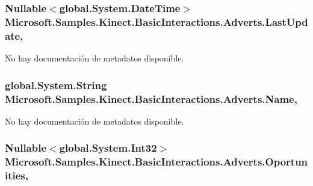 \hypertarget{class_microsoft_1_1_samples_1_1_kinect_1_1_basic_interactions_1_1_adverts_a15fd8b003d880267cc1c3b6eee837e9e}{
\subsubsection[{Last\-Update}]{\setlength{\rightskip}{0pt plus 5cm}Nullable$<$global.\-System.\-Date\-Time$>$ Microsoft.\-Samples.\-Kinect.\-Basic\-Interactions.\-Adverts.\-Last\-Update\hspace{0.3cm}{\ttfamily [get]}, {\ttfamily [set]}}}\label{class_microsoft_1_1_samples_1_1_kinect_1_1_basic_interactions_1_1_adverts_a15fd8b003d880267cc1c3b6eee837e9e}


No hay documentación de metadatos disponible. 

\hypertarget{class_microsoft_1_1_samples_1_1_kinect_1_1_basic_interactions_1_1_adverts_ade56db6e7a214151a3724dc147dda366}{
\subsubsection[{Name}]{\setlength{\rightskip}{0pt plus 5cm}global.\-System.\-String Microsoft.\-Samples.\-Kinect.\-Basic\-Interactions.\-Adverts.\-Name\hspace{0.3cm}{\ttfamily [get]}, {\ttfamily [set]}}}\label{class_microsoft_1_1_samples_1_1_kinect_1_1_basic_interactions_1_1_adverts_ade56db6e7a214151a3724dc147dda366}


No hay documentación de metadatos disponible. 

\hypertarget{class_microsoft_1_1_samples_1_1_kinect_1_1_basic_interactions_1_1_adverts_acdef349135cf4650eb7b48d2af0cbbeb}{
\subsubsection[{Oportunities}]{\setlength{\rightskip}{0pt plus 5cm}Nullable$<$global.\-System.\-Int32$>$ Microsoft.\-Samples.\-Kinect.\-Basic\-Interactions.\-Adverts.\-Oportunities\hspace{0.3cm}{\ttfamily [get]}, {\ttfamily [set]}}}\label{class_microsoft_1_1_samples_1_1_kinect_1_1_basic_interactions_1_1_adverts_acdef349135cf4650eb7b48d2af0cbbeb}


